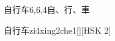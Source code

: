 \begin{entry}{自行车}{6,6,4}{⾃、⾏、⾞}
  \begin{phonetics}{自行车}{zi4xing2che1}[][HSK 2]
  \end{phonetics}
\end{entry}
